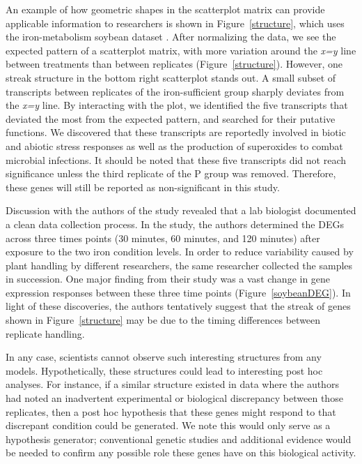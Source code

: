 \documentclass{bmcart}
\begin{document}
\begin{linenumbers}
\begin{doublespacing}
An example of how geometric shapes in the scatterplot matrix can provide applicable information to researchers is shown in Figure~\ref{structure}, which uses the iron-metabolism soybean dataset \cite{Lauter16}. After normalizing the data, we see the expected pattern of a scatterplot matrix, with more variation around the \textit{x=y} line between treatments than between replicates (Figure~\ref{structure}). However, one streak structure in the bottom right scatterplot stands out. A small subset of transcripts between replicates of the iron-sufficient group sharply deviates from the \textit{x=y} line. By interacting with the plot, we identified the five transcripts that deviated the most from the expected pattern, and searched for their putative functions. We discovered that these transcripts are reportedly involved in biotic and abiotic stress responses as well as the production of superoxides to combat microbial infections. It should be noted that these five transcripts did not reach significance unless the third replicate of the P group was removed. Therefore, these genes will still be reported as non-significant in this study.

Discussion with the authors of the study revealed that a lab biologist documented a clean data collection process. In the study, the authors determined the DEGs across three times points (30 minutes, 60 minutes, and 120 minutes) after exposure to the two iron condition levels. In order to reduce variability caused by plant handling by different researchers, the same researcher collected the samples in succession. One major finding from their study was a vast change in gene expression responses between these three time points (Figure~\ref{soybeanDEG}). In light of these discoveries, the authors tentatively suggest that the streak of genes shown in Figure~\ref{structure} may be due to the timing differences between replicate handling.

In any case, scientists cannot observe such interesting structures from any models. Hypothetically, these structures could lead to interesting post hoc analyses. For instance, if a similar structure existed in data where the authors had noted an inadvertent experimental or biological discrepancy between those replicates, then a post hoc hypothesis that these genes might respond to that discrepant condition could be generated. We note this would only serve as a hypothesis generator; conventional genetic studies and additional evidence would be needed to confirm any possible role these genes have on this biological activity.


\end{doublespacing}
\end{linenumbers}
\end{document}
